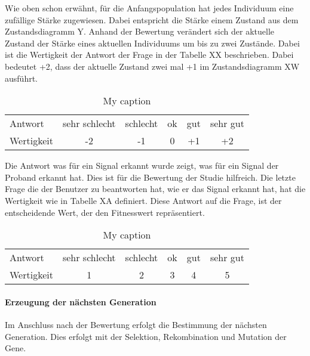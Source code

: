 Wie oben schon erw{\"a}hnt,  f{\"u}r die Anfangspopulation hat jedes Individuum eine zuf{\"a}llige St{\"a}rke zugewiesen. Dabei entspricht die St{\"a}rke einem Zustand aus dem Zustandsdiagramm Y. Anhand der Bewertung ver{\"a}ndert sich der aktuelle Zustand der St{\"a}rke eines aktuellen Individuums um bis zu zwei Zust{\"a}nde. Dabei ist die Wertigkeit der Antwort der Frage in der Tabelle XX beschrieben. Dabei bedeutet +2, dass der aktuelle Zustand zwei mal +1 im Zustandsdiagramm XW ausf{\"u}hrt. 

%

\begin{table}[]
\centering
\caption{My caption}
\label{my-label}
\begin{tabular}{llllll}
Antwort   & sehr schlecht          & schlecht               & ok                    & gut                   & sehr gut              \\
Wertigkeit & \multicolumn{1}{c}{-2} & \multicolumn{1}{c}{-1} & \multicolumn{1}{c}{0} & \multicolumn{1}{c}{+1} & \multicolumn{1}{c}{+2}
\end{tabular}
\end{table}

Die Antwort was f{\"u}r ein Signal erkannt wurde zeigt, was f{\"u}r ein Signal der Proband erkannt hat. Dies ist f{\"u}r die Bewertung der Studie hilfreich.
Die letzte Frage die der Benutzer zu beantworten hat, wie er das Signal erkannt hat, hat die Wertigkeit wie in Tabelle XA definiert. Diese Antwort auf die Frage, ist der entscheidende Wert, der den Fitnesswert repr{\"a}sentiert. 

\begin{table}[]
\centering
\caption{My caption}
\label{my-label}
\begin{tabular}{llllll}
Antwort   & sehr schlecht          & schlecht               & ok                    & gut                   & sehr gut              \\
Wertigkeit & \multicolumn{1}{c}{1} & \multicolumn{1}{c}{2} & \multicolumn{1}{c}{3} & \multicolumn{1}{c}{4} & \multicolumn{1}{c}{5}
\end{tabular}
\end{table}

\paragraph{Erzeugung der n{\"a}chsten Generation}
Im Anschluss nach der Bewertung erfolgt die Bestimmung der n{\"a}chsten Generation. Dies erfolgt mit der Selektion, Rekombination und Mutation der Gene. 

